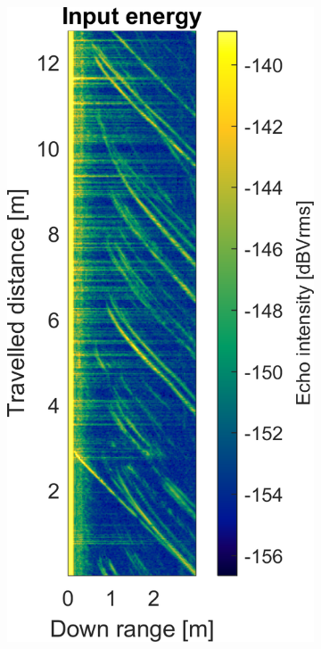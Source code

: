 \begin{figure}[htbp]
    \centering
    \begin{subfigure}[t]{0.475\linewidth}
        \centering
        \includegraphics[width=\linewidth,max height=.475\textheight]{gfx/results/queue_input.png}

\end{subfigure}
\end{figure}
